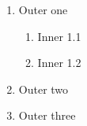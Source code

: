 \documentclass{article}
\begin{document}
\begin{enumerate}
  \item Outer one
  \begin{enumerate}
    \item Inner 1.1
    \item Inner 1.2
  \end{enumerate}
  \item Outer two
  \item Outer three
\end{enumerate}
\end{document}

